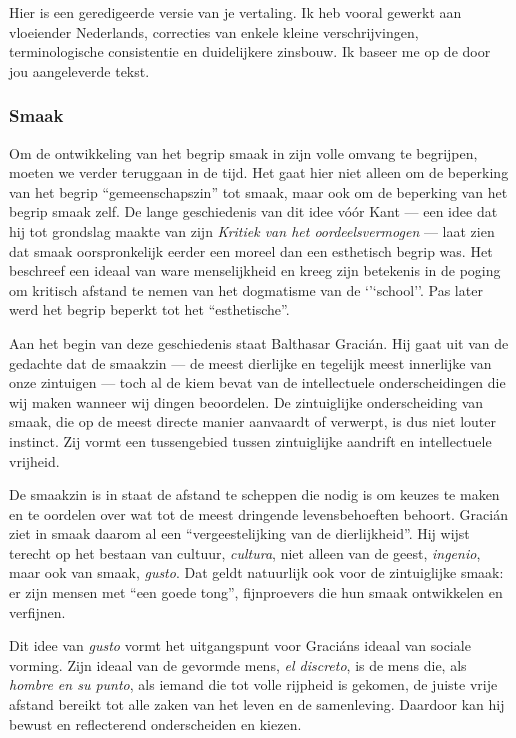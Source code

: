 Hier is een geredigeerde versie van je vertaling. Ik heb vooral gewerkt aan vloeiender Nederlands, correcties van enkele kleine verschrijvingen, terminologische consistentie en duidelijkere zinsbouw. Ik baseer me op de door jou aangeleverde tekst. 

\subsubsection{Smaak}

Om de ontwikkeling van het begrip smaak in zijn volle omvang te begrijpen, moeten we verder teruggaan in de tijd. Het gaat hier niet alleen om de beperking van het begrip ``gemeenschapszin'' tot smaak, maar ook om de beperking van het begrip smaak zelf. De lange geschiedenis van dit idee vóór Kant — een idee dat hij tot grondslag maakte van zijn \textit{Kritiek van het oordeelsvermogen} — laat zien dat smaak oorspronkelijk eerder een moreel dan een esthetisch begrip was. Het beschreef een ideaal van ware menselijkheid en kreeg zijn betekenis in de poging om kritisch afstand te nemen van het dogmatisme van de `'`school''. Pas later werd het begrip beperkt tot het ``esthetische''.

Aan het begin van deze geschiedenis staat Balthasar Gracián. Hij gaat uit van de gedachte dat de smaakzin — de meest dierlijke en tegelijk meest innerlijke van onze zintuigen — toch al de kiem bevat van de intellectuele onderscheidingen die wij maken wanneer wij dingen beoordelen. De zintuiglijke onderscheiding van smaak, die op de meest directe manier aanvaardt of verwerpt, is dus niet louter instinct. Zij vormt een tussengebied tussen zintuiglijke aandrift en intellectuele vrijheid.

De smaakzin is in staat de afstand te scheppen die nodig is om keuzes te maken en te oordelen over wat tot de meest dringende levensbehoeften behoort. Gracián ziet in smaak daarom al een ``vergeestelijking van de dierlijkheid''. Hij wijst terecht op het bestaan van cultuur, \textit{cultura}, niet alleen van de geest, \textit{ingenio}, maar ook van smaak, \textit{gusto}. Dat geldt natuurlijk ook voor de zintuiglijke smaak: er zijn mensen met ``een goede tong'', fijnproevers die hun smaak ontwikkelen en verfijnen.

Dit idee van \textit{gusto} vormt het uitgangspunt voor Graciáns ideaal van sociale vorming. Zijn ideaal van de gevormde mens, \textit{el discreto}, is de mens die, als \textit{hombre en su punto}, als iemand die tot volle rijpheid is gekomen, de juiste vrije afstand bereikt tot alle zaken van het leven en de samenleving. Daardoor kan hij bewust en reflecterend onderscheiden en kiezen.

